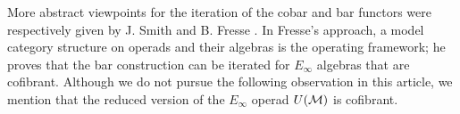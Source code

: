More abstract viewpoints for the iteration of the cobar and bar functors were respectively given by J. Smith \cite{smith1994cobar} and B. Fresse \cite{fresse2010props}.
In Fresse's approach, a model category structure on operads and their algebras is the operating framework; he proves that the bar construction can be iterated for $E_\infty$ algebras that are cofibrant.
Although we do not pursue the following observation in this article, we mention that the reduced version of the $E_\infty$ operad $U(\mathcal{M})$ is cofibrant.






